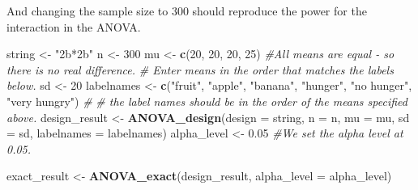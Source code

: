 \documentclass[
]{book}
\newenvironment{Shaded}{\begin{snugshade}}{\end{snugshade}}
\newcommand{\CommentTok}[1]{\textcolor[rgb]{0.56,0.35,0.01}{\textit{#1}}}
\newcommand{\DataTypeTok}[1]{\textcolor[rgb]{0.13,0.29,0.53}{#1}}
\newcommand{\DecValTok}[1]{\textcolor[rgb]{0.00,0.00,0.81}{#1}}
\newcommand{\FloatTok}[1]{\textcolor[rgb]{0.00,0.00,0.81}{#1}}
\newcommand{\KeywordTok}[1]{\textcolor[rgb]{0.13,0.29,0.53}{\textbf{#1}}}
\newcommand{\NormalTok}[1]{#1}
\newcommand{\StringTok}[1]{\textcolor[rgb]{0.31,0.60,0.02}{#1}}
\begin{document}
And changing the sample size to 300 should reproduce the power for the interaction in the ANOVA.

\begin{Shaded}
\begin{Highlighting}[]
\NormalTok{string <-}\StringTok{ "2b*2b"}
\NormalTok{n <-}\StringTok{ }\DecValTok{300}
\NormalTok{mu <-}\StringTok{ }\KeywordTok{c}\NormalTok{(}\DecValTok{20}\NormalTok{, }\DecValTok{20}\NormalTok{, }\DecValTok{20}\NormalTok{, }\DecValTok{25}\NormalTok{) }\CommentTok{#All means are equal - so there is no real difference.}
\CommentTok{# Enter means in the order that matches the labels below.}
\NormalTok{sd <-}\StringTok{ }\DecValTok{20}
\NormalTok{labelnames <-}\StringTok{ }\KeywordTok{c}\NormalTok{(}\StringTok{"fruit"}\NormalTok{, }\StringTok{"apple"}\NormalTok{, }\StringTok{"banana"}\NormalTok{, }
                \StringTok{"hunger"}\NormalTok{, }\StringTok{"no hunger"}\NormalTok{, }\StringTok{"very hungry"}\NormalTok{) }\CommentTok{#}
\CommentTok{# the label names should be in the order of the means specified above.}
\NormalTok{design_result <-}\StringTok{ }\KeywordTok{ANOVA_design}\NormalTok{(}\DataTypeTok{design =}\NormalTok{ string,}
                   \DataTypeTok{n =}\NormalTok{ n, }
                   \DataTypeTok{mu =}\NormalTok{ mu, }
                   \DataTypeTok{sd =}\NormalTok{ sd, }
                   \DataTypeTok{labelnames =}\NormalTok{ labelnames)}
\NormalTok{alpha_level <-}\StringTok{ }\FloatTok{0.05} \CommentTok{#We set the alpha level at 0.05. }

\NormalTok{exact_result <-}\StringTok{ }\KeywordTok{ANOVA_exact}\NormalTok{(design_result, }\DataTypeTok{alpha_level =}\NormalTok{ alpha_level)}
\end{Highlighting}
\end{Shaded}
\end{document}
